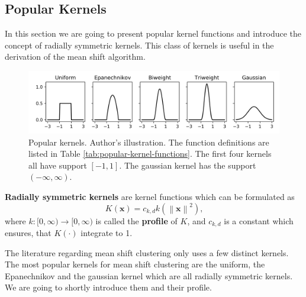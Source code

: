 \documentclass{article}
\newcommand{\norm}[1]{\left\lVert#1\right\rVert}
\begin{document}


\subsection{Popular Kernels} \label{sec:popular-kernels}

In this section we are going to present popular kernel functions and introduce the concept of radially symmetric kernels. This class of kernels is useful in the derivation of the mean shift algorithm.

\begin{figure}
	\centering
	\includegraphics[width=\textwidth]{figures/kde-popular-kernels}
	\caption[Popular kernels]{Popular kernels. Author's illustration. The function definitions are listed in Table \ref{tab:popular-kernel-functions}. The first four kernels all have support $[-1, 1]$. The gaussian kernel has the support $(-\infty, \infty)$.}
	\label{fig:kde-popular-kernels}
\end{figure}

\newpage
\textbf{Radially symmetric kernels} are kernel functions which can be formulated as
\begin{equation}
	K(\bm{x}) = c_{k,d} k(\norm{\bm{x}}^2)\text{,}
\end{equation}
where $k : [0, \infty) \rightarrow [0, \infty)$ is called the \textbf{profile} of $K$, and $c_{k,d}$ is a constant which ensures, that $K(\cdot)$ integrate to 1.


The literature regarding mean shift clustering only uses a few distinct kernels. The most popular kernels for mean shift clustering are the uniform, the Epanechnikov and the gaussian kernel which are all radially symmetric kernels. We are going to shortly introduce them and their profile.
\end{document}
